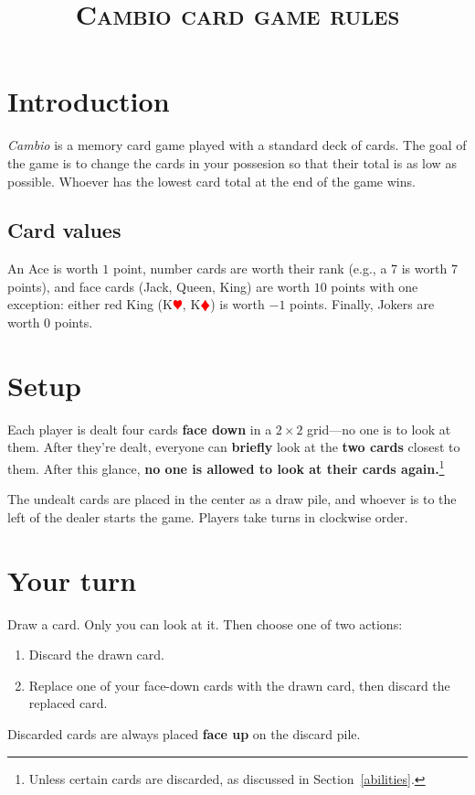 \documentclass[12pt]{article}
\title{{\textsc{Cambio card game rules}}}
\date{}
\newcommand{\heart}{\textcolor{red}{$\varheartsuit$}}
\renewcommand{\diamond}{\textcolor{red}{$\vardiamondsuit$}}
\begin{document}
\maketitle

\section{Introduction}
\textit{Cambio} is a memory card game played with a standard deck of cards. The goal of the game is to change the cards in your possesion so that their total is as low as possible. Whoever has the lowest card total at the end of the game wins.

\subsection*{Card values}
An Ace is worth $1$ point, number cards are worth their rank (e.g., a 7 is worth $7$ points), and face cards (Jack, Queen, King) are worth $10$ points with one exception: either red King (K\heart, K\diamond) is worth $-1$ points. Finally, Jokers are worth $0$ points.

\section{Setup}
Each player is dealt four cards \textbf{face down} in a $2\times2$ grid---no one is to look at them. After they're dealt, everyone can \textbf{briefly} look at the \textbf{two cards} closest to them. After this glance, \textbf{no one is allowed to look at their cards again.}\footnote{Unless certain cards are discarded, as discussed in Section~\ref{abilities}.}

The undealt cards are placed in the center as a draw pile, and whoever is to the left of the dealer starts the game. Players take turns in clockwise order.


\section{Your turn}
Draw a card. Only you can look at it. Then choose one of two actions: 
\begin{enumerate}[(1)]
\item Discard the drawn card.
\item Replace one of your face-down cards with the drawn card, then discard the replaced card.
\end{enumerate}
Discarded cards are always placed \textbf{face up} on the discard pile.
\end{document}
